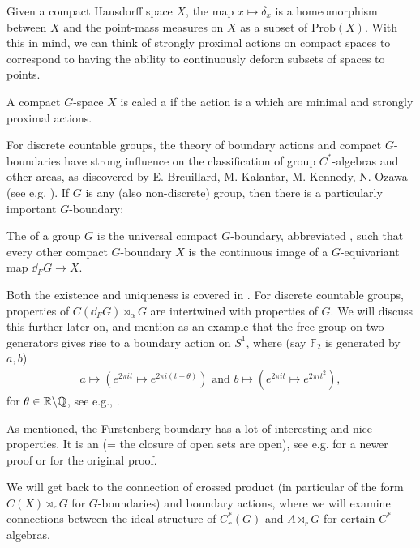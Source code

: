 \begin{note}
	Given a compact Hausdorff space $X$, the map $x \mapsto \delta_x$ is a homeomorphism between $X$ and the point-mass measures on $X$ as a subset of $\mathrm{Prob}(X)$. With this in mind, we can think of strongly proximal actions on compact spaces to correspond to having the ability to continuously deform subsets of spaces to points.
\end{note}
\begin{definition}
	A compact $G$-space $X$ is caled a  if the action is a  which are minimal and strongly proximal actions.
\end{definition}
For discrete countable groups, the theory of boundary actions and compact $G$-boundaries have strong influence on the classification of group $C^*$-algebras and other areas, as discovered by E. Breuillard, M. Kalantar, M. Kennedy, N. Ozawa (see e.g. \cite{breuillard2017c}). If $G$ is any (also non-discrete) group, then there is a particularly important $G$-boundary:
\begin{definition}
	The  of a group $G$ is the universal compact $G$-boundary, abbreviated , such that every other compact $G$-boundary $X$ is the continuous image of a $G$-equivariant map $\dd_F G \to X$.
\end{definition}
Both the existence and uniqueness is covered in \cite[Chapter 4]{bscp}. For discrete countable groups, properties of $C(\dd_F G) \rtimes_\alpha G$ are intertwined with properties of $G$. We will discuss this further later on, and mention as an example that the free group on two generators gives rise to a boundary action on $S^1$, where (say $\mathbb{F}_2$ is generated by $a,b$)
\begin{align*}
	a \mapsto (e^{2 \pi i t} \mapsto e^{2 \pi i (t+\theta)}) \text{  and  } b \mapsto (e^{2 \pi i t} \mapsto e^{2 \pi i t^{2}}),
\end{align*}
for $\theta \in \mathbb{R}\backslash \mathbb{Q}$, see e.g., \cite[Example 4.13]{bscp}.

As mentioned, the Furstenberg boundary has a lot of interesting and nice properties. It is an  (= the closure of open sets are open), see e.g. \cite[Proposition 2.4]{breuillard2017c} for a newer proof or \cite[4.18]{hamana1979injective} for the original proof.

We will get back to the connection of crossed product (in particular of the form $C(X) \rtimes_r G$ for $G$-boundaries) and boundary actions, where we will examine connections between the ideal structure of $C_r^*(G)$ and $A \rtimes_r G$ for certain $C^*$-algebras.
